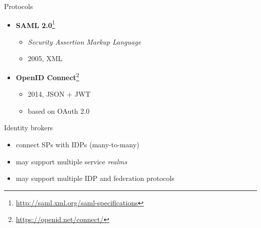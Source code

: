 \documentclass[ignorenonframetext,aspectratio=169]{beamer}
\providecommand{\tightlist}{%
  \setlength{\itemsep}{0pt}\setlength{\parskip}{0pt}}
\begin{document}
\begin{frame}{Protocols}
\begin{itemize}

\item \textbf{SAML 2.0}\footnote{\url{http://saml.xml.org/saml-specifications}}
    \begin{itemize}
    \tightlist
    \item \emph{Security Assertion Markup Language}
    \item 2005, XML
    \end{itemize}

\item \textbf{OpenID Connect}\footnote{\url{https://openid.net/connect/}}
    \begin{itemize}
    \tightlist
    \item 2014, JSON + JWT
    \item based on OAuth 2.0
    \end{itemize}

\end{itemize}
\end{frame}

\begin{frame}{Identity brokers}

\begin{itemize}
\tightlist
\item
  connect SPs with IDPs (many-to-many)
\item
  may support multiple service \emph{realms}
\item
  may support multiple IDP and federation protocols
\end{itemize}

\end{frame}

\begin{frame}[plain]
\centering
{}
\end{frame}
\end{document}
